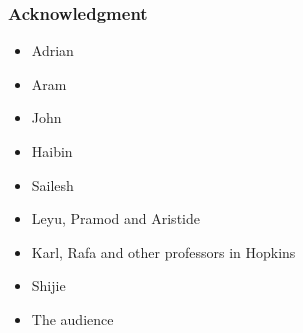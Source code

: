 \documentclass[10pt]{beamer}
\begin{document}

\frame
{
  \frametitle{Acknowledgment}
\begin{itemize}
\item Adrian
\item Aram
\item John
\item Haibin
\item Sailesh
\item Leyu, Pramod and Aristide
\item Karl, Rafa and other professors in Hopkins
\item Shijie 
\item The audience
\end{itemize}

}
\end{document}
